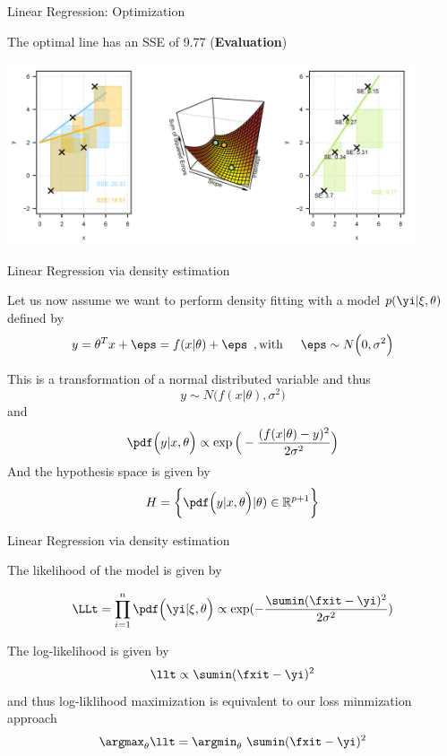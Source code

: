 
\begin{vbframe}{Linear Regression: Optimization}

The optimal line has an SSE of 9.77 (\textbf{Evaluation})

\vspace{0.3cm}
\begin{center}
\includegraphics[width=0.9\textwidth]{plots/lin-reg-optim03.png}
\end{center}

\end{vbframe}


\begin{frame}{Linear Regression via density estimation}

Let us now assume we want to perform density fitting with a model
$p(\yi|\xi, \theta)$ defined by 
$$
y = 
\theta^T x + \eps = f(x|\theta) + \eps \enspace,
 \text{with  \;\;\;\;}  \eps \sim N\Big(0, \sigma^2\Big)
$$

\pause 

This is a transformation of a normal distributed variable and thus
$$
y \sim N\Big( f(x|\theta), \sigma^2\Big)
$$
and 
$$
 \pdf\Big(y | x , \theta \Big) \propto \exp\Big(-\frac{ (f(x|\theta) - y)^2}{2\sigma^2}\Big)
$$
And the hypothesis space is given by 
$$
 H= \biggl\lbrace
 \pdf\Big(y | x , \theta \Big) | \theta ) \in \mathbb{R}^{p+1} \biggr\rbrace
$$

\end{frame}


\begin{frame}{Linear Regression via density estimation}

The likelihood of the model is given by

$$
\LLt = \prod_{i=1}^n   \pdf\Big(\yi | \xi , \theta \Big)
\propto \exp(-\frac{\sumin (\fxit - \yi)^2}{2\sigma^2})
$$
\pause

The log-likelihood is given by 
$$
\llt \propto \sumin (\fxit - \yi)^2 
$$
and thus log-liklihood maximization is equivalent to our loss minmization approach
$$
\argmax_{\theta}\llt = \argmin_{\theta}\ \sumin (\fxit - \yi)^2 
$$
\end{frame}


